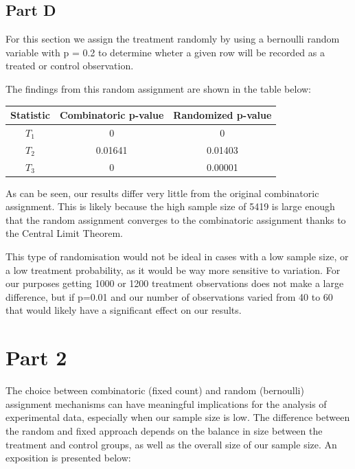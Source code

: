\documentclass[12pt]{article}
\begin{document}
\subsection{Part D}

For this section we assign the treatment randomly by using a bernoulli random variable with p = 0.2 to determine wheter a given row will be recorded as a treated or control observation. 
\newline

The findings from this random assignment are shown in the table below:

\begin{center}
\begin{tabular}{|c | c | c |} 
 \hline
 Statistic & Combinatoric p-value & Randomized p-value  \\ [0.5ex] 
 \hline
 $T_1$ & 0 & 0  \\ [0.5ex]
 \hline
 $T_2$ & 0.01641 & 0.01403  \\ [0.5ex]
 \hline
 $T_3$ & 0 & 0.00001 \\ [0.5ex] 
 \hline
\end{tabular}
\end{center}


As can be seen, our results differ very little from the original combinatoric assignment. This is likely because the high sample size of 5419 is large enough that the random assignment converges to the combinatoric assignment thanks to the Central Limit Theorem.

This type of randomisation would not be ideal in cases with a low sample size, or a low treatment probability, as it would be way more sensitive to variation. For our purposes getting 1000 or 1200 treatment observations does not make a large difference, but if p=0.01 and our number of observations varied from 40 to 60 that would likely have a significant effect on our results.

\section{Part 2}

The choice between combinatoric (fixed count) and random (bernoulli) assignment mechanisms can have meaningful implications for the analysis of experimental data, especially when our sample size is low. The difference between the random and fixed approach depends on the balance in size between the treatment and control groups, as well as the overall size of our sample size. An exposition is presented below:
\newline
\end{document}
